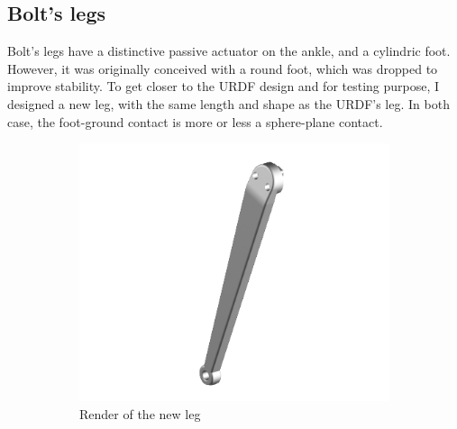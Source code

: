 \documentclass[a4paper,10pt]{article}
\begin{document}
\subsection{Bolt's legs}
Bolt's legs have a distinctive passive actuator on the ankle, and a cylindric foot. However, it was originally conceived with a round foot, which was dropped to improve stability. To get closer to the URDF design and for testing purpose, I designed a new leg, with the same length and shape as the URDF's leg. In both case, the foot-ground contact is more or less a sphere-plane contact.

\begin{figure}[H]
\centering

\begin{subfigure}{.5\textwidth}
\centering
  \includegraphics[width=1\linewidth, angle=0, scale=1.2]{./images/render_leg.png}
  \caption{Render of the new leg}
\end{subfigure}%
\begin{subfigure}{.5\textwidth}
\centering

\end{subfigure}
\end{figure}
\end{document}
